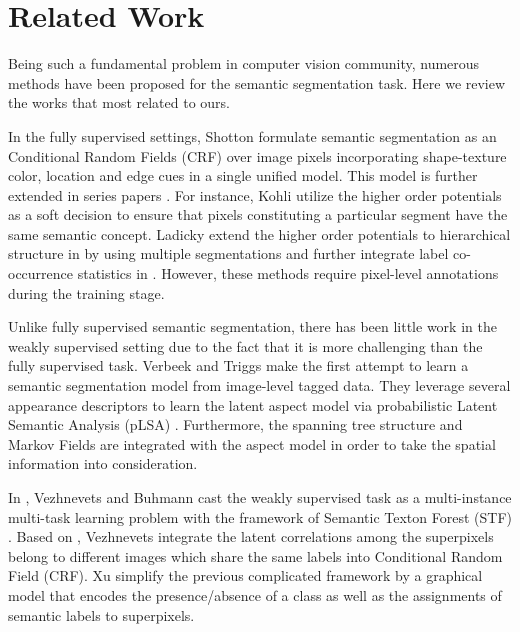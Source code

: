 \section{Related Work}
Being such a fundamental problem in computer vision community, numerous methods have been proposed for the semantic segmentation task. Here we review the works that most related to ours.

In the fully supervised settings, Shotton \etal \cite{shotton2006textonboost} formulate semantic segmentation as an Conditional Random Fields (CRF) over image pixels incorporating shape-texture color, location and edge cues in a single unified model. This model is further extended in series papers \cite{kohli2009robust,ladicky2009associative,ladicky2010graph}. For instance, Kohli \etal utilize the higher order potentials \cite{kohli2009robust} as a soft decision to ensure that pixels constituting a particular segment have the same semantic concept. Ladicky \etal extend the higher order potentials to hierarchical structure in \cite{ladicky2009associative} by using multiple segmentations and further integrate label co-occurrence statistics in \cite{ladicky2010graph}. However, these methods require pixel-level annotations during the training stage.

Unlike fully supervised semantic segmentation, there has been little work in the weakly supervised setting due to the fact that it is more challenging than the fully supervised task. Verbeek and Triggs \cite{verbeek2007region} make the first attempt to learn a semantic segmentation model from image-level tagged data. They leverage several appearance descriptors to learn the latent aspect model via probabilistic Latent Semantic Analysis (pLSA) \cite{hofmann1999probabilistic}. Furthermore, the spanning tree structure and Markov Fields are integrated with the aspect model in order to take the spatial information into consideration. 

In \cite{vezhnevets2010towards}, Vezhnevets and Buhmann cast the weakly supervised task as a multi-instance multi-task learning problem with the framework of Semantic Texton Forest (STF) \cite{shotton2008semantic}. Based on \cite{vezhnevets2010towards}, Vezhnevets \etal \cite{vezhnevets2011weakly,vezhnevets2012weakly} integrate the latent correlations among the superpixels belong to different images which share the same labels into Conditional Random Field (CRF). Xu \etal \cite{xu2014tell} simplify the previous complicated framework by a graphical model that encodes the presence/absence of a class as well as the assignments of semantic labels to superpixels.

